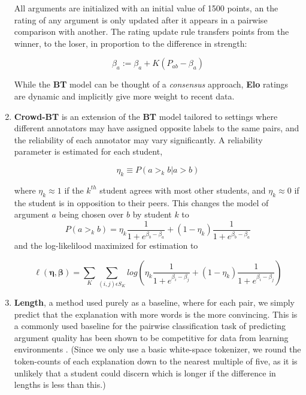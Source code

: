 \documentclass[sigconf]{acmart}
\begin{document}
\begin{enumerate}
	All arguments are initialized with an initial value of 1500 points, an the 
	rating of any argument is only updated after it appears in a pairwise 
	comparison with another.
	The rating update rule transfers points from the winner, to the loser, in 
	proportion to the difference in strength:
	
	$$
	\beta_a:=\beta_a+K(P_{ab} - \beta_a)
	$$
	
	While the \textbf{BT} model can be thought of a \textit{consensus} 
	approach, \textbf{Elo} ratings are dynamic and implicitly give more weight 
	to recent data\cite{aldous_elo_2017}.
	
	\item \textbf{Crowd-BT} \cite{chen_pairwise_2013} is an extension of the 
	\textbf{BT} model tailored to settings where different annotators may have 
	assigned opposite labels to the same pairs, and the reliability of each 
	annotator may vary significantly. 
	A reliability parameter is estimated for each student, 
	
	$$
	\eta_k \equiv P(a >_k b | a >b )
	$$

	where $\eta_k \approx 1$ if the $k^{th}$ student agrees with most other 
	students, and $\eta_k \approx 0$ if the student is in opposition to their 
	peers.
	This changes the model of argument $a$ being chosen over $b$ by student $k$ 
	to 
	$$
	P(a >_k b) = 
	\eta_k \frac{1}{1+e^{\beta_b-\beta_a}} + (1-\eta_k) 
	\frac{1}{1+e^{\beta_b-\beta_a}}
	$$
	and the log-likelilood maximized for estimation to 
	
	$$
	\ell(\boldsymbol{\eta},\boldsymbol{\beta})=\sum_{K}\sum_{(i,j)\epsilon 
	S_K}^{} 
	log(\eta_k\frac{1}{1+e^{\beta_i - \beta_j}} + 
	(1-\eta_k)\frac{1}{1+e^{\beta_i - \beta_j}})
	$$
	
	\item \textbf{Length}, a method used purely as a baseline, where for each 
	pair, we simply predict that the explanation with more words is the more 
	convincing.
	This is a commonly used baseline  for the pairwise classification task of 
	predicting argument quality \cite{toledo_automatic_2019} has been shown to 
	be competitive for data from learning environments 
	\cite{bhatnagar_learnersourcing_2020}.
	(Since we only use a basic white-space tokenizer, we round the token-counts 
	of each explanation down to the nearest multiple of five, as it is unlikely 
	that a student could discern which is longer if the difference in lengths 
	is less than this.)
\end{enumerate}
\end{document}

